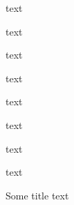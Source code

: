 \documentclass{article}
\begin{document}
text

\begin{framed}
text
\end{framed}

\begin{oframed}
text
\end{oframed}

\begin{shaded}
text
\end{shaded}

\begin{shaded*}
text
\end{shaded*}

\begin{leftbar}
text
\end{leftbar}

\begin{snugshade}
text
\end{snugshade}

\begin{snugshade*}
text
\end{snugshade*}

\begin{titled-frame}{Some title}
text
\end{titled-frame}
\end{document}
